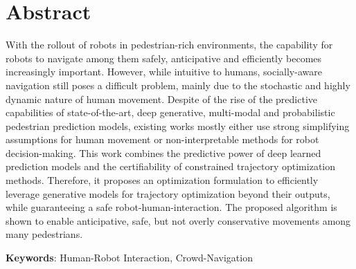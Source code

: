\chapter*{Abstract}
With the rollout of robots in pedestrian-rich environments, the capability for robots to navigate among them safely, anticipative and efficiently becomes increasingly important. However, while intuitive to humans, socially-aware navigation still poses a difficult problem, mainly due to the stochastic and highly dynamic nature of human movement. Despite of the rise of the predictive capabilities of state-of-the-art, deep generative, multi-modal and probabilistic pedestrian prediction models, existing works mostly either use strong simplifying assumptions for human movement or non-interpretable methods for robot decision-making. This work combines the predictive power of deep learned prediction models and the certifiability of constrained trajectory optimization methods. Therefore, it proposes an optimization formulation to efficiently leverage generative models for trajectory optimization beyond their outputs, while guaranteeing a safe robot-human-interaction. The proposed algorithm is shown to enable anticipative, safe, but not overly conservative movements among many pedestrians.

\vspace{1cm}
\textbf{Keywords}: Human-Robot Interaction, Crowd-Navigation 
